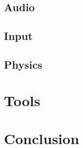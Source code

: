 \documentclass{projdoc}
\begin{document}
\subsection{Audio}

\subsection{Input}

\subsection{Physics}


\section{Tools}

\section{Conclusion}
\end{document}
